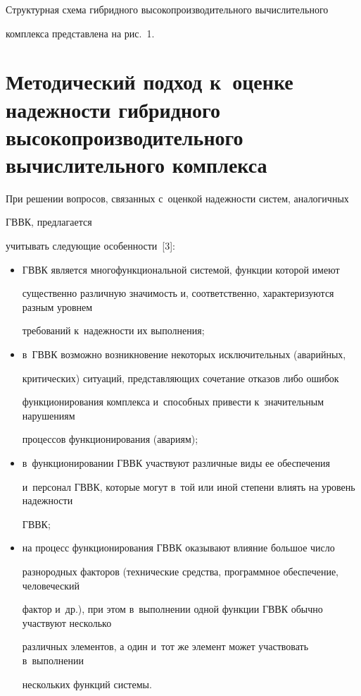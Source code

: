       

      Структурная схема гибридного высокопроизводительного вычислительного 

комплекса представлена на рис.~1.



\section{Методический подход к~оценке надежности гибридного высокопроизводительного вычислительного комплекса}



      При решении вопросов, связанных с~оценкой надежности систем, аналогичных 

ГВВК, предлагается 

учитывать следующие особенности~[3]:

      \begin{itemize}

      \item ГВВК является многофункциональной системой, функции которой имеют 

существенно различную значимость и, соответственно, характеризуются разным уровнем 

требований к~надежности их выполнения;

\item в~ГВВК возможно возникновение некоторых исключительных (аварийных, 

критических) ситуаций, представляющих сочетание отказов либо ошибок 

функционирования комплекса и~способных привести к~значительным нарушениям 

процессов функционирования (авариям);

      \item в~функционировании ГВВК участвуют различные виды ее обеспечения 

и~персонал ГВВК, которые могут в~той или иной степени влиять на уровень надежности 

ГВВК;

      \item  на процесс функционирования ГВВК оказывают влияние большое число 

разнородных факторов (технические средства, программное обеспечение, человеческий 

фактор и~др.), при этом в~выполнении одной функции ГВВК обычно участвуют несколько 

различных элементов, а один и~тот же элемент может участвовать в~выполнении 

нескольких функций системы.

      \end{itemize}

